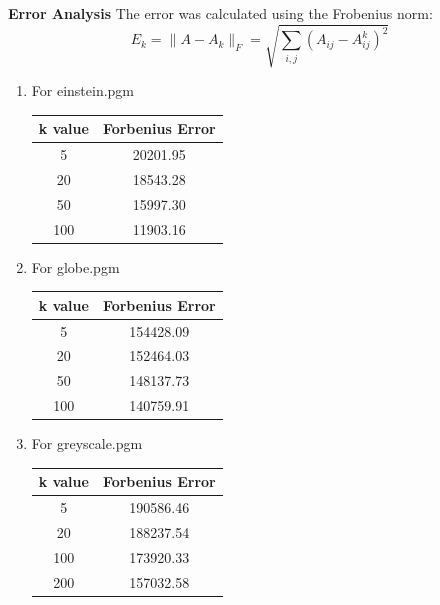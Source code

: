 \documentclass[journal]{IEEEtran}
\begin{document}
\textbf{Error Analysis}
The error was calculated using the Frobenius norm:
\[
E_k = \| A - A_k \|_F = \sqrt{ \sum_{i,j} (A_{ij} - A_{ij}^{k})^2 }
\]

\begin{enumerate}

\item For einstein.pgm
\begin{table}[H]
    \centering
    \begin{tabular}{|c|c|}
        \hline
        \textbf{k value} & \textbf{Forbenius Error} \\  
        \hline
        5 & 20201.95 \\                              
        \hline
        20 & 18543.28 \\                         
        \hline
        50 & 15997.30 \\       
        \hline
        100 & 11903.16 \\       
        \hline
    \end{tabular}
       \label{tab:1}
\end{table}

\item For globe.pgm
\begin{table}[H]
    \centering
    \begin{tabular}{|c|c|}
        \hline
        \textbf{k value} & \textbf{Forbenius Error} \\  
        \hline
        5 & 154428.09 \\                              
        \hline
        20 & 152464.03 \\                         
        \hline
        50 & 148137.73 \\       
        \hline
        100 & 140759.91 \\       
        \hline
    \end{tabular}
    \label{tab:2}
\end{table}

\item For greyscale.pgm
\begin{table}[H]
    \centering
    \begin{tabular}{|c|c|}
        \hline
        \textbf{k value} & \textbf{Forbenius Error} \\  
     \hline
        5 & 190586.46 \\                              
        \hline
        20 & 188237.54 \\                         
        \hline
        100 & 173920.33 \\       
        \hline
        200 & 157032.58 \\       
        \hline
    \end{tabular}
    \label{tab:3}
\end{table}

\end{enumerate}
\end{document}
